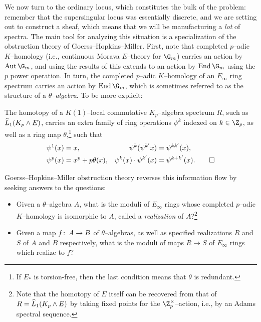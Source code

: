 We now turn to the ordinary locus, which constitutes the bulk of the problem: remember that the supersingular locus was essentially discrete, and we are setting out to construct a sheaf, which means that we will be manufacturing a \emph{lot} of spectra.  The main tool for analyzing this situation is a specialization of the obstruction theory of Goerss--Hopkins--Miller.  First, note that completed $p$--adic $K$--homology (i.e., continuous Morava $E$--theory for $\G_m$) carries an action by $\Aut \G_m$, and using the results of  this extends to an action by $\End \G_m$ using the $p${\th} power operation.  In turn, the completed $p$--adic $K$--homology of an $E_\infty$ ring spectrum carries an action by $\End \G_m$, which is sometimes referred to as the structure of a \textit{$\theta$--algebra}.  To be more explicit:
\begin{theorem}[McClure]
The homotopy of a $K(1)$--local commutative $K_p$--algebra spectrum $R$, such as $\widehat L_1 (K_p \wedge E)$, carries an extra family of ring operations $\psi^k$ indexed on $k \in \Z_p$, as well as a ring map $\theta$,\footnote{If $E_*$ is torsion-free, then the last condition means that $\theta$ is redundant.} such that
\pushQED{\qed}
\begin{align*}
\psi^1(x) & = x, &
\psi^k (\psi^{k'} x) & = \psi^{kk'}(x), \\
\psi^p(x) & = x^p + p\theta(x), &
\psi^k(x) \cdot \psi^{k'}(x) & = \psi^{k + k'}(x). \qedhere
\end{align*}
\popQED
\end{theorem}
\noindent Goerss--Hopkins--Miller obstruction theory reverses this information flow by seeking answers to the questions:
\begin{itemize}
    \item Given a $\theta$--algebra $A$, what is the moduli of $E_\infty$ rings whose completed $p$--adic $K$--homology is isomorphic to $A$, called a \textit{realization} of $A$?\footnote{Note that the homotopy of $E$ itself can be recovered from that of $R = \widehat L_1 (K_p \wedge E)$ by taking fixed points for the $\Z_p^\times$--action, i.e., by an Adams spectral sequence.}
    \item Given a map $f\colon\thinspace A \to B$ of $\theta$--algebras, as well as specified realizations $R$ and $S$ of $A$ and $B$ respectively, what is the moduli of maps $R \to S$ of $E_\infty$ rings which realize to $f$?
\end{itemize}

